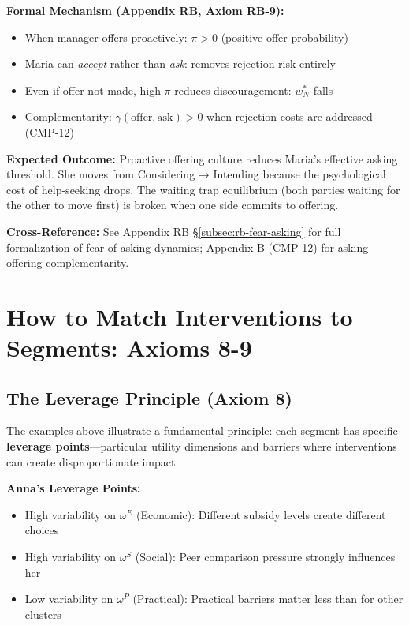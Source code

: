 \textbf{Formal Mechanism (Appendix RB, Axiom RB-9):}
\begin{itemize}[nosep]
    \item When manager offers proactively: $\pi > 0$ (positive offer probability)
    \item Maria can \emph{accept} rather than \emph{ask}: removes rejection risk entirely
    \item Even if offer not made, high $\pi$ reduces discouragement: $w^*_N$ falls
    \item Complementarity: $\gamma(\text{offer}, \text{ask}) > 0$ when rejection costs
    are addressed (CMP-12)
\end{itemize}

\textbf{Expected Outcome:} Proactive offering culture reduces Maria's effective asking
threshold. She moves from Considering → Intending because the psychological cost of
help-seeking drops. The waiting trap equilibrium (both parties waiting for the other
to move first) is broken when one side commits to offering.

\textbf{Cross-Reference:} See Appendix RB §\ref{subsec:rb-fear-asking} for full formalization
of fear of asking dynamics; Appendix B (CMP-12) for asking-offering complementarity.

\section{How to Match Interventions to Segments: Axioms 8-9}
\label{sec:intervention-matching}

\subsection{The Leverage Principle (Axiom 8)}

The examples above illustrate a fundamental principle: each segment has specific
\textbf{leverage points}---particular utility dimensions and barriers where
interventions can create disproportionate impact.

\textbf{Anna's Leverage Points:}
\begin{itemize}[nosep]
\item High variability on $\omega^E$ (Economic): Different subsidy levels create different choices
\item High variability on $\omega^S$ (Social): Peer comparison pressure strongly influences her
\item Low variability on $\omega^P$ (Practical): Practical barriers matter less than for other clusters
\end{itemize}

